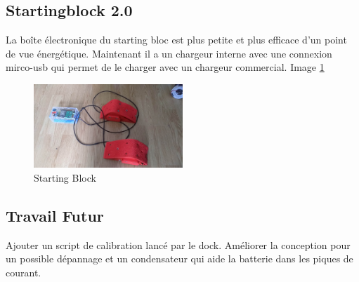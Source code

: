 \documentclass[12pt]{article}
\begin{document}


\subsection{Startingblock 2.0}
\begin{par}
 	La boîte électronique du starting bloc est plus 	petite et plus efficace d'un point de vue énergétique.	Maintenant il a un chargeur interne avec une connexion 	mirco-usb qui permet de le charger avec un chargeur commercial. Image \ref{img:sb:complete}
\end{par}

\begin{figure}[!htb]
	\centering
	\includegraphics[width=0.5\textwidth]{img/StartingBlockCompleto.jpg}
	\caption{Starting Block}
	\label{img:sb:complete}
\end{figure}

\subsection*{Travail Futur}
\begin{par}
	Ajouter un script de calibration lancé par le dock. 	Améliorer la conception pour un possible dépannage et 	un condensateur qui aide 	la batterie dans les piques de courant.
\end{par}
\end{document}
